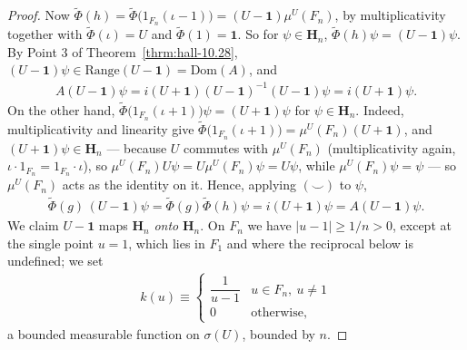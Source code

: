 \begin{proof}
Now $\widetilde\Phi(h) = \widetilde\Phi\big(1_{F_n}(\iota-1)\big) = (U - \mathbf{1})\mu^U(F_n)$, by multiplicativity together with $\widetilde\Phi(\iota) = U$ and $\widetilde\Phi(1) = \mathbf{1}$. So for $\psi \in \mathbf{H}_n$, $\widetilde\Phi(h)\psi = (U-\mathbf{1})\psi$. By Point 3 of Theorem~\ref{thrm:hall-10.28}, $(U-\mathbf{1})\psi \in \text{Range}(U-\mathbf{1}) = \text{Dom}(A)$, and
\begin{align}
    A(U-\mathbf{1})\psi = i(U+\mathbf{1})(U-\mathbf{1})^{-1}(U-\mathbf{1})\psi = i(U+\mathbf{1})\psi.
\end{align}
On the other hand, $\widetilde\Phi\big(1_{F_n}(\iota+1)\big)\psi = (U+\mathbf{1})\psi$ for $\psi \in \mathbf{H}_n$. Indeed, multiplicativity and linearity give $\widetilde\Phi\big(1_{F_n}(\iota+1)\big) = \mu^U(F_n)(U+\mathbf{1})$, and $(U+\mathbf{1})\psi \in \mathbf{H}_n$ — because $U$ commutes with $\mu^U(F_n)$ (multiplicativity again, $\iota\cdot 1_{F_n} = 1_{F_n}\cdot\iota$), so $\mu^U(F_n)U\psi = U\mu^U(F_n)\psi = U\psi$, while $\mu^U(F_n)\psi = \psi$ — so $\mu^U(F_n)$ acts as the identity on it. Hence, applying $(\smile)$ to $\psi$,
\begin{align}
    \widetilde\Phi(g)\,(U-\mathbf{1})\psi = \widetilde\Phi(g)\widetilde\Phi(h)\psi = i(U+\mathbf{1})\psi = A(U-\mathbf{1})\psi.
\end{align}
We claim $U - \mathbf{1}$ maps $\mathbf{H}_n$ \textit{onto} $\mathbf{H}_n$. On $F_n$ we have $\lvert u - 1 \rvert \ge 1/n > 0$, except at the single point $u = 1$, which lies in $F_1$ and where the reciprocal below is undefined; we set
\begin{align}
    k(u) \equiv \begin{cases} \dfrac{1}{u-1} & u \in F_n,\ u \ne 1 \\[4pt] 0 & \text{otherwise,} \end{cases}
\end{align}
a bounded measurable function on $\sigma(U)$, bounded by $n$.


\end{proof}
